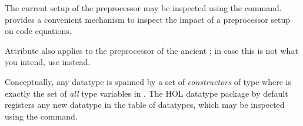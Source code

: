 \begin{isabellebody}
\begin{isamarkuptext}
  \noindent The current setup of the preprocessor may be inspected using
  the \hyperlink{command.print-codeproc}{\mbox{}} command.
  \hyperlink{command.code-thms}{\mbox{}} provides a convenient
  mechanism to inspect the impact of a preprocessor setup
  on code equations.

  \begin{warn}

    Attribute \hyperlink{attribute.code-unfold}{\mbox{}} also applies to the
    preprocessor of the ancient ; in case
    this is not what you intend, use \hyperlink{attribute.code-inline}{\mbox{}} instead.
  \end{warn}%
\end{isamarkuptext}%
\isamarkuptrue%
%
\isamarkuptrue%
%
\begin{isamarkuptext}%
Conceptually, any datatype is spanned by a set of
  \emph{constructors} of type  where  is exactly the set of \emph{all} type variables in
  \isa{{\isasymtau}}.  The HOL datatype package by default registers any new
  datatype in the table of datatypes, which may be inspected using the
  \hyperlink{command.print-codesetup}{\mbox{}} command.


\end{isamarkuptext}
\end{isabellebody}
